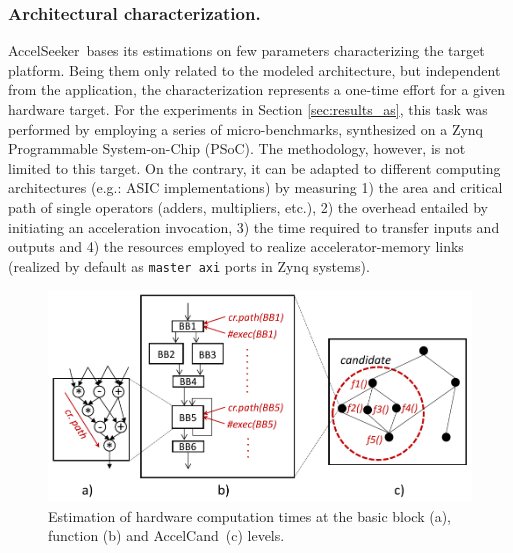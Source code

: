 \documentclass[]{usiinfthesis}
\newcommand{\aseeker}{{AccelSeeker}}
\newcommand{\candidate}{{AccelCand}}
\begin{document}
\subsubsection{Architectural characterization.}
\aseeker\ bases its estimations on few parameters characterizing the
target platform.  Being them only related to the modeled architecture, but 
independent from the application, the characterization represents a one-time 
effort for a given hardware target.
For the experiments in Section \ref{sec:results_as}, this task was
performed by employing a series of micro-benchmarks, synthesized on a
Zynq Programmable System-on-Chip (PSoC). 
The methodology, however, is not limited to this target. On the contrary, it can 
be adapted to different computing architectures (e.g.: ASIC implementations) by 
measuring 1) the area and critical path of single operators (adders, multipliers, 
etc.), 2) the overhead entailed by initiating an acceleration invocation, 3) the 
time required to transfer inputs and outputs and 4) the resources employed to realize 
accelerator-memory links (realized by default as \texttt{master axi} ports in Zynq 
systems).\par

\begin{figure}[!t]
  \centering
  \includegraphics[width=.8\linewidth]{figs/merit_estimation.pdf}
  \caption{Estimation of hardware computation times at the basic block (a), function (b) and 
  \candidate\ (c) levels.}
  \label{fig:hw-comp}
\end{figure}
\end{document}
